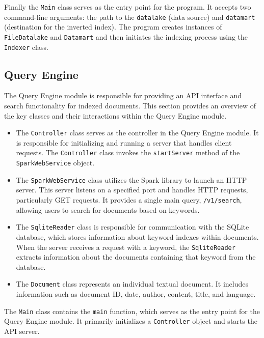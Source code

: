 \documentclass{article}
\begin{document}
Finally the \texttt{Main} class serves as the entry point for the program. It accepts two command-line arguments: the path to the \texttt{datalake} (data source) and \texttt{datamart} (destination for the inverted index). The program creates instances of \texttt{FileDatalake} and \texttt{Datamart} and then initiates the indexing process using the \texttt{Indexer} class.

\subsection{Query Engine}

The Query Engine module is responsible for providing an API interface and search functionality for indexed documents. This section provides an overview of the key classes and their interactions within the Query Engine module.

\begin{itemize}
\item
The \texttt{Controller} class serves as the controller in the Query Engine module. It is responsible for initializing and running a server that handles client requests. The \texttt{Controller} class invokes the \texttt{startServer} method of the \texttt{SparkWebService} object.

\item
The \texttt{SparkWebService} class utilizes the Spark library to launch an HTTP server. This server listens on a specified port and handles HTTP requests, particularly GET requests. It provides a single main query, \texttt{/v1/search}, allowing users to search for documents based on keywords.

\item
The \texttt{SqliteReader} class is responsible for communication with the SQLite database, which stores information about keyword indexes within documents. When the server receives a request with a keyword, the \texttt{SqliteReader} extracts information about the documents containing that keyword from the database.

\item 
The \texttt{Document} class represents an individual textual document. It includes information such as document ID, date, author, content, title, and language.
\end{itemize}


The \texttt{Main} class contains the \texttt{main} function, which serves as the entry point for the Query Engine module. It primarily initializes a \texttt{Controller} object and starts the API server.
\end{document}
